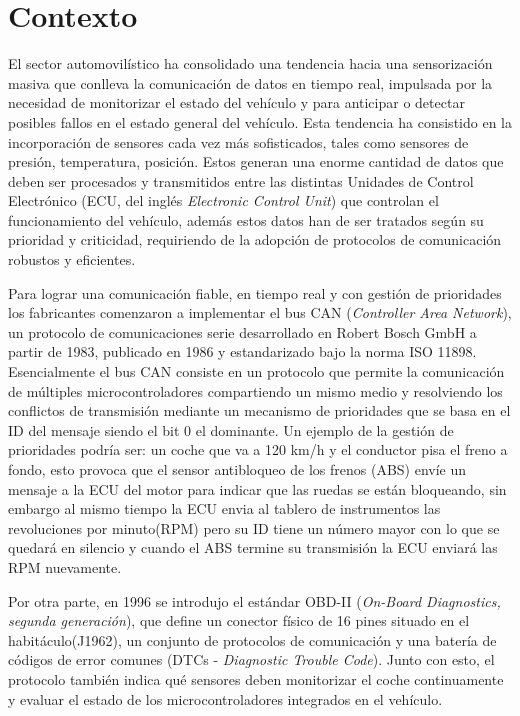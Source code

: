 \section{Contexto}

El sector automovilístico ha consolidado una tendencia hacia una sensorización masiva que conlleva la comunicación de datos en tiempo real, impulsada por la necesidad de monitorizar el estado del vehículo y para anticipar o detectar posibles fallos en el estado general del vehículo. Esta tendencia ha consistido en la incorporación de sensores cada vez más sofisticados, tales como sensores de presión, temperatura, posición. Estos generan una enorme cantidad de datos que deben ser procesados y transmitidos entre las distintas Unidades de Control Electrónico (ECU, del inglés \textit{Electronic Control Unit}) que controlan el funcionamiento del vehículo, además estos datos han de ser tratados según su prioridad y criticidad, requiriendo de la adopción de protocolos de comunicación robustos y eficientes.

Para lograr una comunicación fiable, en tiempo real y con gestión de prioridades los fabricantes comenzaron a implementar el bus CAN (\textit{Controller Area Network}), un protocolo de comunicaciones serie desarrollado en Robert Bosch GmbH a partir de 1983, publicado en 1986 y estandarizado bajo la norma ISO 11898. Esencialmente el bus CAN consiste en un protocolo que permite la comunicación de múltiples microcontroladores compartiendo un mismo medio y resolviendo los conflictos de transmisión mediante un mecanismo de prioridades que se basa en el ID del mensaje siendo el bit 0 el dominante. Un ejemplo de la gestión de prioridades podría ser: un coche que va a 120 km/h y el conductor pisa el freno a fondo, esto provoca que el sensor antibloqueo de los frenos (ABS) envíe un mensaje a la ECU del motor para indicar que las ruedas se están bloqueando, sin embargo al mismo tiempo la ECU envia al tablero de instrumentos las revoluciones por minuto(RPM) pero su ID tiene un número mayor con lo que se quedará en silencio y cuando el ABS termine su transmisión la ECU enviará las RPM nuevamente.

Por otra parte, en 1996 se introdujo el estándar OBD-II (\textit{On-Board Diagnostics, segunda generación}), que define un conector físico de 16 pines situado en el habitáculo(J1962), un conjunto de protocolos de comunicación y una batería de códigos de error comunes (DTCs - \textit{Diagnostic Trouble Code}). Junto con esto, el protocolo también indica qué sensores deben monitorizar el coche continuamente y evaluar el estado de los microcontroladores integrados en el vehículo.

